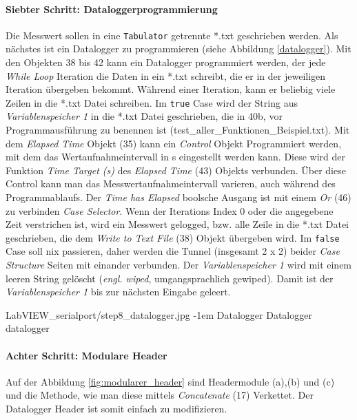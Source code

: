 \paragraph{Siebter Schritt: Dataloggerprogrammierung}
\label{sec:Datalogger}

Die Messwert sollen in eine \texttt{Tabulator} getrennte *.txt geschrieben werden. Als nächstes ist ein Datalogger zu programmieren (siehe Abbildung \ref{datalogger}). Mit den Objekten 38 bis 42 kann ein Datalogger programmiert werden, der jede \textit{While Loop} Iteration die Daten in ein *.txt schreibt, die er in der jeweiligen Iteration übergeben bekommt. Während einer Iteration, kann er beliebig viele Zeilen in die *.txt Datei schreiben. Im \texttt{true} Case wird der String aus \textit{Variablenspeicher 1} in die *.txt Datei geschrieben, die in 40b, vor Programmausführung zu benennen ist (test\_aller\_Funktionen\_Beispiel.txt). Mit dem \textit{Elapsed Time} Objekt (35) kann ein \textit{Control} Objekt Programmiert werden, mit dem das Wertaufnahmeintervall in s eingestellt werden kann. Diese wird der Funktion \textit{Time Target (s)} des \textit{Elapsed Time} (43) Objekts verbunden. Über diese Control kann man das Messwertaufnahmeintervall varieren, auch während des Programmablaufs. Der \textit{Time has Elapsed} boolsche Ausgang ist mit einem \textit{Or} (46) zu verbinden \textit{Case Selector}. Wenn der Iterations Index 0 oder die angegebene Zeit verstrichen ist, wird ein Messwert gelogged, bzw. alle Zeile in die *.txt Datei geschrieben, die dem \textit{Write to Text File} (38) Objekt übergeben wird. Im \texttt{false} Case soll nix passieren, daher werden die Tunnel (insgesamt 2 x 2) beider \textit{Case Structure} Seiten mit einander verbunden. Der \textit{Variablenspeicher 1} wird mit einem leeren String gelöscht (\textit{engl. wiped}, umgangsprachlich gewiped). Damit ist der \textit{Variablenspeicher 1} bis zur nächsten Eingabe geleert.

{LabVIEW_serialport/step8_datalogger.jpg}
{-1em}
{Datalogger}
{Datalogger}
{datalogger}



\paragraph{Achter Schritt: Modulare Header}

Auf der Abbildung \ref{fig:modularer_header} sind Headermodule (a),(b) und (c) und die Methode, wie man diese mittels \textit{Concatenate} (17) Verkettet. Der Datalogger Header ist somit einfach zu modifizieren.

